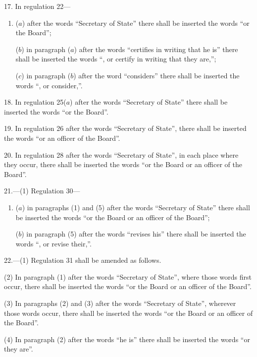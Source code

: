\documentclass[12pt,a4paper]{article}
\begin{document}
\medskip

17.  In regulation 22—
\begin{enumerate}\item[]
($a$) after the words “Secretary of State” there shall be inserted the words “or the Board”;

($b$) in paragraph ($a$)  after the words “certifies in writing that he is” there shall be inserted the words “, or certify in writing that they are,”;

($c$) in paragraph ($b$)  after the word “considers” there shall be inserted the words “, or consider,”.
\end{enumerate}

\medskip

18.  In regulation 25($a$)  after the words “Secretary of State” there shall be inserted the words “or the Board”.

\medskip

19.  In regulation 26 after the words “Secretary of State”, there shall be inserted the words “or an officer of the Board”.

\medskip

20.  In regulation 28 after the words “Secretary of State”, in each place where they occur, there shall be inserted the words “or the Board or an officer of the Board”.

\medskip

21.---(1)  Regulation 30—
\begin{enumerate}\item[]
($a$) in paragraphs (1) and (5) after the words “Secretary of State” there shall be inserted the words “or the Board or an officer of the Board”;

($b$) in paragraph (5) after the words “revises his” there shall be inserted the words “, or revise their,”.
\end{enumerate}

\medskip

22.---(1)  Regulation 31 shall be amended as follows.

(2) In paragraph (1) after the words “Secretary of State”, where those words first occur, there shall be inserted the words “or the Board or an officer of the Board”.

(3) In paragraphs (2) and (3) after the words “Secretary of State”, wherever those words occur, there shall be inserted the words “or the Board or an officer of the Board”.

(4) In paragraph (2) after the words “he is” there shall be inserted the words “or they are”.
\end{document}
